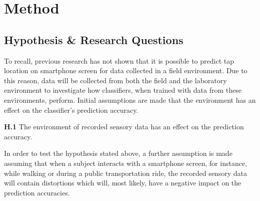 \chapter{Method\label{cha:chapter5}}

\section{Hypothesis \& Research Questions}
\label{sec:hypothesis}
To recall, previous research has not shown that it is possible to predict tap location on smartphone screen for data collected in a field environment. Due to this reason, data will be collected from both the field and the laboratory environment to investigate how classifiers, when trained with data from these environments, perform.
Initial assumptions are made that the environment has an effect on the classifier's prediction accuracy.

\begin{center}
  \begin{mdframed}[backgroundcolor=gray!10] 
    \textbf{H.1}  The environment of recorded sensory data has an effect on the prediction accuracy.
  \end{mdframed}
\end{center}

In order to test the hypothesis stated above, a further assumption is made assuming that when a subject interacts with a smartphone screen, for instance, while walking or during a public transportation ride, the recorded sensory data will contain distortions which will, most likely, have a negative impact on the prediction accuracies. 

